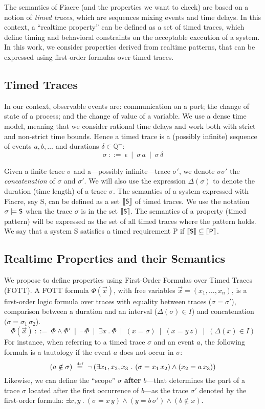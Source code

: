 \documentclass[a4paper]{scrartcl}
\def\code#1{\textsf{\small\bfseries #1}}
\def\vars#1{\textsf{\small #1}}
\let\s\sigma
\newcommand{\rational}{\mathbb{Q}}
\newcommand{\rationalp}{\rational^{+}}
\def\such{\ .\ }
\let\delay\delta
\newcommand{\sem}[1]{[\kern-.5mm[{#1}]\kern-.5mm]}
\newcommand{\eqdef}{\ensuremath{\overset{\text{\tiny def}}{=}}}
\begin{document}
The semantics of Fiacre (and the properties we want to check) are
based on a notion of \emph{timed traces}, which are sequences mixing
events and time delays. In this context, a ``realtime property'' can
be defined as a set of timed traces, which define timing and
behavioral constraints on the acceptable execution of a system. In
this work, we consider properties derived from realtime patterns, that
can be expressed using first-order formulas over timed traces.

\subsection{Timed Traces} 
In our context, observable events are: communication on a port; the
change of state of a process; and the change of value of a
variable. We use a dense time model, meaning that we consider rational
time delays and work both with strict and non-strict time
bounds. Hence a timed trace is a (possibly infinite) sequence of
events $a, b, \dots$ and durations $\delay \in \rationalp$:
\[\sigma \ ::=\ \epsilon \ \mid\ \sigma \, a \ \mid \ \sigma \,
\delay\]


Given a finite trace $\s$ and a---possibly infinite---trace $\s'$, we
denote $\s \s'$ the \emph{concatenation} of $\s$ and $\s'$.  We will
also use the expression $\Delta(\s)$ to denote the duration (time
length) of a trace $\s$. The semantics of a system expressed with
Fiacre, say \vars{S}, can be defined as a set $\sem{\vars{S}}$ of
timed traces. We use the notation $\s \models \vars{S}$ when the trace
$\s$ is in the set $\sem{\vars{S}}$.  The semantics of a property
(timed pattern) will be expressed as the set of all timed traces where
the pattern holds.  We say that a system \vars{S} satisfies a timed
requirement \vars{P} if $\sem{\vars{S}} \subseteq \sem{\vars{P}}$.

\subsection{Realtime Properties and their Semantics}
We propose to define properties using First-Order Formulas over Timed
Traces (FOTT). A FOTT formula $\Phi(\vec x)$, with free variables
$\vec x = (x_1, \dots, x_n)$, is a first-order logic formula over
traces with equality between traces ($\s = \s'$), comparison between a
duration and an interval ($\Delta(\s) \in I$) and concatenation $(\s =
\s_1 \, \s_2$).
\[
\Phi(\vec x) \ ::=\ \Phi \wedge \Phi' \ \mid\ \neg \Phi \ \mid \
\exists x \such \Phi \ \mid\ (x = \s) \ \mid\ (x = y \, z) \ \mid \
(\Delta(x) \in I) \]
For instance, when referring to a timed trace $\s$ and an event $a$,
the following formula is a tautology if the event $a$ does not occur
in $\s$:
\[
(a \notin \s) \ \eqdef\ \neg \left ( \exists x_1, x_2, x_3 \such (\s =
  x_1 \, x_2) \wedge (x_2 = a\, x_3) \right ) \]
Likewise, we can define the ``scope'' $\s$ \code{after} $b$---that
determines the part of a trace $\s$ located after the first occurrence
of $b$---as the trace $\s'$ denoted by the first-order formula:
$\exists x, y \such (\s = x\, y) \wedge (y = b\, \s') \wedge \left (b
  \notin x \right )$.
\end{document}
